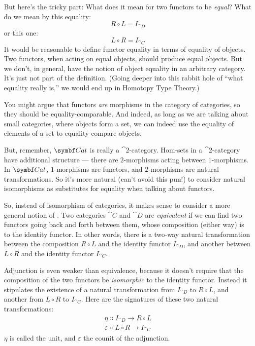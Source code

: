\noindent
But here's the tricky part: What does it mean for two functors to be
\emph{equal}? What do we mean by this equality:
\[R \circ L = I_{\cat{D}}\]
or this one:
\[L \circ R = I_{\cat{C}}\]
It would be reasonable to define functor equality in terms of equality
of objects. Two functors, when acting on equal objects, should produce
equal objects. But we don't, in general, have the notion of object
equality in an arbitrary category. It's just not part of the definition.
(Going deeper into this rabbit hole of ``what equality really is,'' we
would end up in Homotopy Type Theory.)

You might argue that functors \emph{are} morphisms in the category of
categories, so they should be equality-comparable. And indeed, as long
as we are talking about small categories, where objects form a set, we
can indeed use the equality of elements of a set to equality-compare
objects.

But, remember, $\Cat$ is really a $\cat{2}$-category. Hom-sets in a
$\cat{2}$-category have additional structure --- there are $2$-morphisms acting
between $1$-morphisms. In $\Cat$, $1$-morphisms are functors, and
$2$-morphisms are natural transformations. So it's more natural (can't
avoid this pun!) to consider natural isomorphisms as substitutes for
equality when talking about functors.

So, instead of isomorphism of categories, it makes sense to consider a
more general notion of . Two categories $\cat{C}$ and
$\cat{D}$ are \emph{equivalent} if we can find two functors going back
and forth between them, whose composition (either way) is
 to the identity functor. In other words,
there is a two-way natural transformation between the composition
$R \circ L$ and the identity functor $I_{\cat{D}}$, and another
between $L \circ R$ and the identity functor $I_{\cat{C}}$.

Adjunction is even weaker than equivalence, because it doesn't require
that the composition of the two functors be \emph{isomorphic} to the
identity functor. Instead it stipulates the existence of a  natural transformation from $I_{\cat{D}}$ to $R \circ L$, and
another from $L \circ R$ to $I_{\cat{C}}$. Here are the signatures of
these two natural transformations:
\begin{gather*}
  \eta \Colon I_{\cat{D}} \to R \circ L \\
  \varepsilon \Colon L \circ R \to I_{\cat{C}}
\end{gather*}
$\eta$ is called the unit, and $\varepsilon$ the counit of the adjunction.

